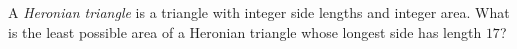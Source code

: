 A \emph{Heronian triangle} is a triangle with integer side lengths and integer area. What is the least possible area of a Heronian triangle whose longest side has length $17$?
